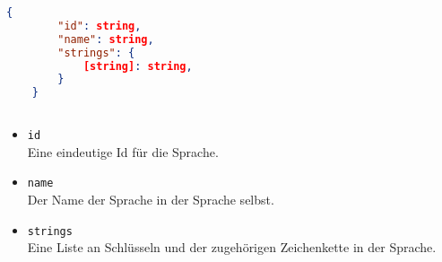 \begin{lstlisting}[language=json,firstnumber=1]
	{
		"id": string,
		"name": string,
		"strings": {
			[string]: string,
		}
	}
	
\end{lstlisting}

\begin{itemize}
	\item \texttt{id} 
	\\ Eine eindeutige Id für die Sprache.
	\item \texttt{name} 
	\\ Der Name der Sprache in der Sprache selbst.
	\item \texttt{strings} 
	\\ Eine Liste an Schlüsseln und der zugehörigen Zeichenkette in der Sprache.
\end{itemize}